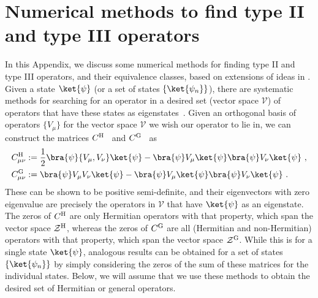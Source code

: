 \documentclass[prx,letterpaper,aps,superscriptaddress,floatfix,twocolumn,nofootinbib]{revtex4-2}
\theoremstyle{definition}
\newcommand{\nn}{\nonumber}
\newcommand{\mZ}{\mathcal{Z}}
\newcommand{\mV}{\mathcal{V}}
\newcommand{\defn}{:=}
\begin{document}
\appendix
%

%
\section{Numerical methods to find type II and type III operators}\label{app:numerical}
%
In this Appendix, we discuss some numerical methods for finding type II and type III operators, and their equivalence classes, based on extensions of ideas in \cite{moudgalya2023numerical}. 
%
Given a state $\ket{\psi}$ (or a set of states $\{\ket{\psi_n}\}$), there are systematic methods for searching for an operator in a desired set (vector space $\mV$) of operators that have these states as eigenstates~\cite{qiranard2017, chertkovclark2018, greiter2018parent, yang2023detecting, yao2022bounding, moudgalya2023numerical}.
%
Given an orthogonal basis of operators $\{V_\mu\}$ for the vector space $\mV$ we wish our operator to lie in, we can construct the matrices $C^{\rm H}$~\cite{qiranard2017} and $C^{\rm G}$~\cite{chertkovclark2018} as
\begin{align}
    C^{\rm H}_{\mu\nu} &\defn  \frac{1}{2}\bra{\psi} \{V_\mu, V_\nu\} \ket{\psi} - \bra{\psi} V_\mu \ket{\psi} \bra{\psi} V_\nu\ket{\psi} ~, \nn \\
    C^{\rm G}_{\mu\nu} &\defn \bra{\psi}V_\mu V_\nu \ket{\psi} - \bra{\psi} V_\mu \ket{\psi}\bra{\psi}V_\nu \ket{\psi} ~. 
\end{align}
%
These can be shown to be positive semi-definite, and their eigenvectors with zero eigenvalue are precisely the operators in $\mV$ that have $\ket{\psi}$ as an eigenstate.
%
The zeros of $C^{\rm H}$ are only Hermitian operators with that property, which span the vector space $\mZ^{\rm H}$, whereas the zeros of $C^{\rm G}$ are all (Hermitian and non-Hermitian) operators with that property, which span the vector space $\mZ^{\rm G}$.
%
While this is for a single state $\ket{\psi}$, analogous results can be obtained for a set of states $\{\ket{\psi_n}\}$ by simply considering the zeros of the sum of these matrices for the individual states. 
%
Below, we will assume that we use these methods to obtain the desired set of Hermitian or general operators. 
%
\end{document}
